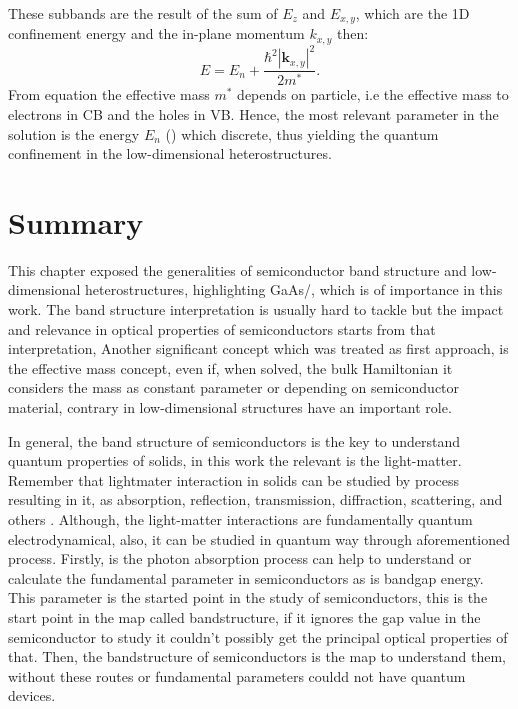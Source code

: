 These subbands are the result of the sum of $E_{z}$ and $E_{x,y}$, which are the 1D confinement energy and the in-plane momentum $k_{x,y}$ then\cite{harrison2016quantum}:
\begin{equation}\label{eqn:chapter-1-total-enery-ema-aprox}		
	E = E_{n} + \dfrac{\hbar^{2}|\boldsymbol{k}_{x,y}|^{2}}{2m^{*}}.
\end{equation}  
From equation the effective mass  $m^*$ depends on particle, i.e the effective mass to electrons in CB and the holes in VB. Hence, the most relevant parameter in the solution is the energy $E_{n}$ () which discrete, thus yielding the quantum confinement in the low-dimensional
heterostructures.


\section{Summary}
\vspace{-10mm} 
This chapter exposed the generalities of semiconductor band structure and low-dimensional
heterostructures, highlighting GaAs/\algaas, which is of importance in this work. The band structure interpretation
is usually hard to tackle  but the impact and relevance in
optical properties of semiconductors starts from that interpretation, Another significant concept which
was treated as first approach, is the effective mass concept, even if, when solved, the bulk
Hamiltonian it considers the mass as constant parameter or depending on semiconductor
material, contrary in low-dimensional structures have an important role.

In general, the band structure of semiconductors is the key to understand quantum
properties of solids, in this work the relevant is the light-matter. Remember that lightmater
interaction in solids can be studied by process resulting in it, as absorption,
reflection, transmission, diffraction, scattering, and others \cite{rivera2020light}. Although, the light-matter
interactions are fundamentally quantum electrodynamical, also, it can be studied in quantum
way through aforementioned process. Firstly, is the photon absorption process can help
to understand or calculate the fundamental parameter in semiconductors as is bandgap
energy. This parameter is the started point in the study of semiconductors, this is the start
point in the map called bandstructure, if it ignores the gap value in the semiconductor to
study it couldn't possibly get the principal optical properties of that.
Then, the bandstructure of semiconductors is the map to understand them, without these
routes or fundamental parameters couldd not have quantum devices.
 
